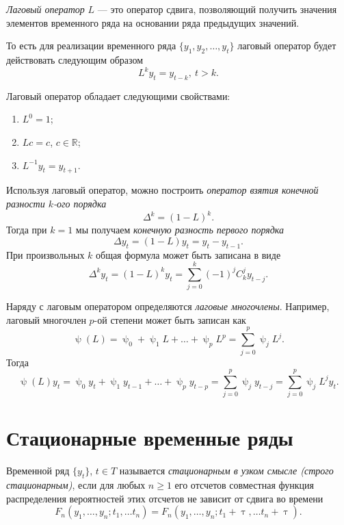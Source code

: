 \documentclass[a4paper, 14pt]{extreport}
\numberwithin{equation}{section}
\newcommand{\Rm}{\mathbb{R}}
\renewcommand{\geq}{\geqslant}
\renewcommand{\tau}{\uptau}
\renewcommand{\psi}{\uppsi}
\numberwithin{equation}{section}
\begin{document}
	\textit{Лаговый оператор}  $L$ --- это оператор сдвига, позволяющий получить значения элементов временного ряда на основании ряда предыдущих значений.
	
	То есть для реализации временного ряда $\{y_1, y_2,\ldots, y_t\}$ лаговый оператор будет действовать следующим образом 
	\begin{equation}\label{lag-op}
		L^k y_t = y_{t-k},\ t>k.
	\end{equation}
	
	Лаговый оператор обладает следующими свойствами:
	\begin{enumerate}
		\item $L^0 = 1$;
		\item $Lc = c$, $c \in \Rm$;
		\item $L^{-1} y_t = y_{t+1}$.
	\end{enumerate}
	
	Используя лаговый оператор, можно построить \textit{оператор взятия конечной разности $k$-ого порядка}
	\begin{equation}
		\Delta^k = (1-L)^k.
	\end{equation}
	Тогда при $k=1$ мы получаем \textit{конечную разность первого порядка}
	\begin{equation}
		\Delta y_t = (1-L)y_t= y_t - y_{t-1}.
	\end{equation}
	При произвольных $k$ общая формула может быть записана в виде
	\begin{equation}
		\Delta^k y_t = (1-L)^k y_t = \sum_{j=0}^{k}(-1)^j C_k^j y_{t-j}.
	\end{equation}
	
	Наряду с лаговым оператором определяются \textit{лаговые многочлены}. Например, лаговый многочлен $p$-ой степени может быть записан как
	\begin{equation}\label{lag-poly}
		\psi(L) = \psi_0 + \psi_1 L + \ldots + \psi_pL^p = \sum_{j = 0}^{p}\psi_j L^j.
	\end{equation}
	Тогда 
	\begin{equation}
		\psi(L)y_t = \psi_0 y_t + \psi_1 y_{t-1} + \ldots + \psi_p y_{t-p} = \sum_{j=0}^p \psi_j y_{t-j} = \sum_{j=0}^p \psi_j L^j y_t.
	\end{equation}
	
	\section{Стационарные временные ряды}
	
	Временной ряд $\{y_t\}$, $t \in T$ называется \textit{стационарным в узком смысле (строго стационарным)}, если для любых $n\geq 1$ его отсчетов совместная функция распределения вероятностей этих отсчетов не зависит от сдвига во времени
	\begin{equation}
		F_n(y_1,\ldots, y_n; t_1 ,\ldots t_n) = F_n(y_1,\ldots, y_n; t_1 + \tau,\ldots t_n+\tau).
	\end{equation}
	
\end{document}
